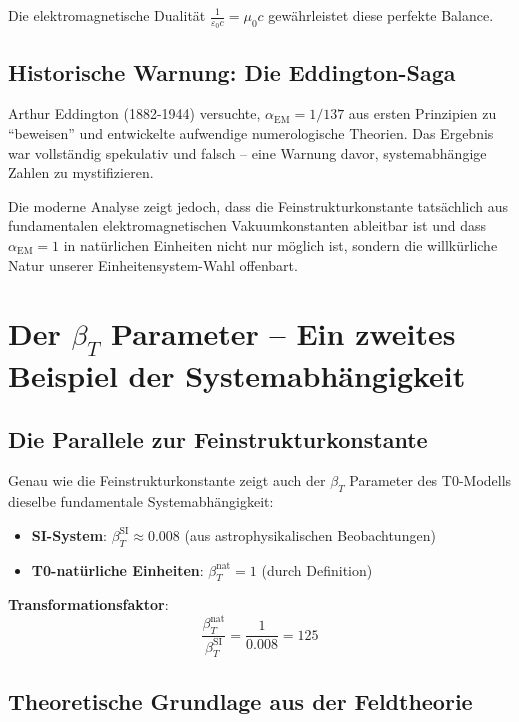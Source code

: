 Die elektromagnetische Dualität $\frac{1}{\varepsilon_0 c} = \mu_0 c$ gewährleistet diese perfekte Balance.

\subsection{Historische Warnung: Die Eddington-Saga}
\label{subsec:eddington_warning}

Arthur Eddington (1882-1944) versuchte, $\alpha_{\text{EM}} = 1/137$ aus ersten Prinzipien zu ``beweisen'' und entwickelte aufwendige numerologische Theorien. Das Ergebnis war vollständig spekulativ und falsch -- eine Warnung davor, systemabhängige Zahlen zu mystifizieren.

Die moderne Analyse zeigt jedoch, dass die Feinstrukturkonstante tatsächlich aus fundamentalen elektromagnetischen Vakuumkonstanten ableitbar ist und dass $\alpha_{\text{EM}} = 1$ in natürlichen Einheiten nicht nur möglich ist, sondern die willkürliche Natur unserer Einheitensystem-Wahl offenbart.

\section{Der $\beta_T$ Parameter -- Ein zweites Beispiel der Systemabhängigkeit}
\label{sec:beta_t}

\subsection{Die Parallele zur Feinstrukturkonstante}
\label{subsec:beta_parallel}

Genau wie die Feinstrukturkonstante zeigt auch der $\beta_T$ Parameter des T0-Modells dieselbe fundamentale Systemabhängigkeit:

\begin{itemize}
	\item \textbf{SI-System}: $\beta_T^{\text{SI}} \approx 0.008$ (aus astrophysikalischen Beobachtungen)
	\item \textbf{T0-natürliche Einheiten}: $\beta_T^{\text{nat}} = 1$ (durch Definition)
\end{itemize}

\textbf{Transformationsfaktor}: 
\begin{equation}
	\frac{\beta_T^{\text{nat}}}{\beta_T^{\text{SI}}} = \frac{1}{0.008} = 125
\end{equation}

\subsection{Theoretische Grundlage aus der Feldtheorie}
\label{subsec:beta_field_theory}

